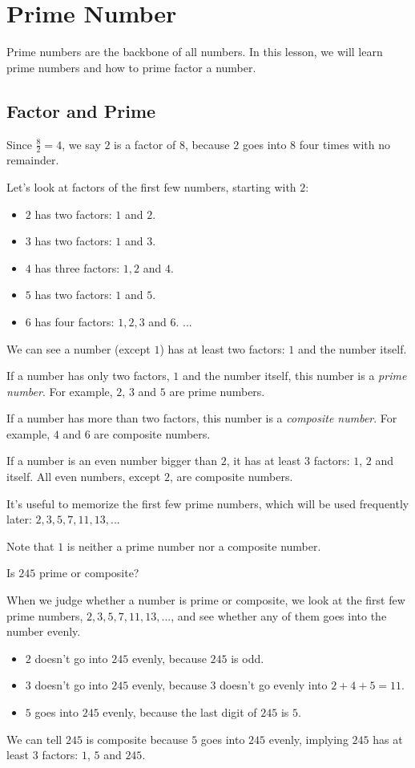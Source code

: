
\section{Prime Number}

Prime numbers are the backbone of all numbers. In this lesson, we will learn prime numbers and how to prime factor a number.

\subsection{Factor and Prime}
Since $\frac{8}{2}=4$, we say $2$ is a factor of $8$, because $2$ goes into $8$ four times with no remainder.

Let's look at factors of the first few numbers, starting with $2$:
\begin{itemize}
\item $2$ has two factors: $1$ and $2$.
\item $3$ has two factors: $1$ and $3$.
\item $4$ has three factors: $1,2$ and $4$.
\item $5$ has two factors: $1$ and $5$.
\item $6$ has four factors: $1,2,3$ and $6$.
...
\end{itemize}
We can see a number (except $1$) has at least two factors: $1$ and the number itself.

If a number has only two factors, $1$ and the number itself, this number is a \textit{prime number}. For example, $2$, $3$ and $5$ are prime numbers.

If a number has more than two factors, this number is a \textit{composite number}. For example, $4$ and $6$ are composite numbers.

If a number is an even number bigger than $2$, it has at least $3$ factors: $1$, $2$ and itself. All even numbers, except $2$, are composite numbers.

It's useful to memorize the first few prime numbers, which will be used frequently later: $2,3,5,7,11,13,...$

Note that $1$ is neither a prime number nor a composite number.

\begin{myexample}
Is $245$ prime or composite?
\end{myexample}
\begin{solution}
When we judge whether a number is prime or composite, we look at the first few prime numbers, $2,3,5,7,11,13,...$, and see whether any of them goes into the number evenly.

\begin{itemize}
\item $2$ doesn't go into $245$ evenly, because $245$ is odd.
\item $3$ doesn't go into $245$ evenly, because $3$ doesn't go evenly into $2+4+5=11$.
\item $5$ goes into $245$ evenly, because the last digit of $245$ is $5$.
\end{itemize}
We can tell $245$ is composite because $5$ goes into $245$ evenly, implying $245$ has at least $3$ factors: $1$, $5$ and $245$.
\end{solution}

